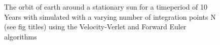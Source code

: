 \documentclass[10pt,showpacs,preprintnumbers,amsmath,amssymb,nofootinbib,aps,prl,twocolumn,groupedaddress,superscriptaddress,showkeys]{revtex4-1}
\begin{document}
\begin{figure}[h!p]
  \caption{The orbit of earth around a stationary sun for a timeperiod of 10 Years with simulated with a varying number of integration points N (see fig titles) using the Velocity-Verlet and Forward Euler algorithms}
  \label{fig:3c_earthsun}
\end{figure}
 
\end{document}
